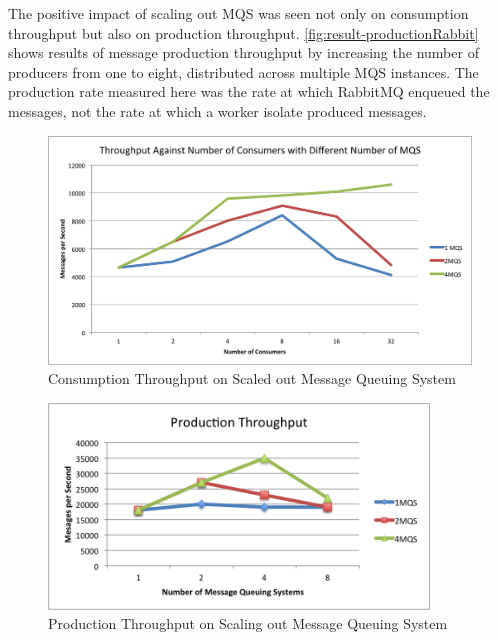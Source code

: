   The positive impact of scaling out MQS was seen not only on consumption throughput but also on production throughput. \autoref{fig:result-productionRabbit} shows results of message production throughput by increasing the number of producers from one to eight, distributed across multiple MQS instances. The production rate measured here was the rate at which RabbitMQ enqueued the messages, not the rate at which a worker isolate produced messages.
\begin{figure}[H]
  \centering
  \includegraphics[width=1\textwidth]{figures/04varyingMqs}
  \caption[Consumption Throughput on Scaled out Message Queuing System]{Consumption Throughput on Scaled out Message Queuing System}
  \label{fig:result-varyingMqs}
\end{figure}


\begin{figure}[H]
  \centering  \includegraphics[width=0.9\textwidth]{figures/05productionRabbit}
  \caption[Production Throughput on Scaling out Message Queuing System]{Production Throughput on Scaling out Message Queuing System}
  \label{fig:result-productionRabbit}
\end{figure}


